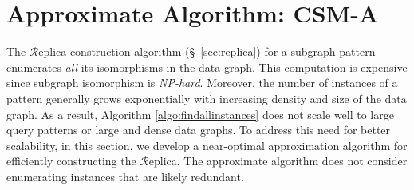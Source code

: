 \section{Approximate Algorithm: {\sf CSM-A}}
\label{sec:approx_algo}
The $\mathcal{R}$eplica construction algorithm (\S~\ref{sec:replica}) for a subgraph pattern enumerates \emph{all} its
isomorphisms in the data graph. %
This computation is expensive since subgraph isomorphism is \textit{NP-hard}.
 Moreover, the number of instances of a pattern generally grows exponentially
with increasing density and size of the data graph. As a result, Algorithm
\ref{algo:findallinstances} does not scale well to large query patterns or large
and dense data graphs. To address this need for better scalability, in this
section, we develop a near-optimal approximation algorithm for efficiently constructing the
$\mathcal{R}$eplica. The approximate algorithm does not consider enumerating instances that are likely redundant.
